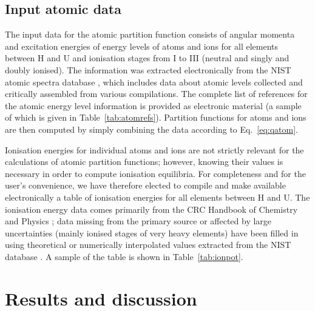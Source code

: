 \documentclass[traditabstract]{aa} %
\begin{document}
\subsection{Input atomic data}
The input data for the atomic partition function consists of angular momenta and excitation energies of energy levels of atoms and ions for all elements between H and U and ionisation stages from I to III (neutral and singly and doubly ionised). The information was extracted electronically from the NIST atomic spectra database \citep{Kramida:2014}, which includes data about atomic levels collected and critically assembled from various compilations. The complete list of references for the atomic energy level information is provided as electronic material (a sample of which is given in Table~\ref{tab:atomrefs}). Partition functions for atoms and ions are then computed by simply combining the data according to Eq.~\ref{eq:qatom}. 

Ionisation energies for individual atoms and ions are not strictly relevant for the calculations of atomic partition functions; however, knowing their values is necessary in order to compute ionisation equilibria. For completeness and for the user's convenience, we have therefore elected to compile and make available electronically a table of ionisation energies for all elements between H and U. The ionisation energy data comes primarily from the CRC Handbook of Chemistry and Physics \citep{CRC:2010}; data missing from the primary source or affected by large uncertainties (mainly ionised stages of very heavy elements) have been filled in using theoretical  or numerically interpolated values extracted from the NIST database \citep{Kramida:2014}. A sample of the table is shown in Table~\ref{tab:ionpot}.

\section{Results and discussion}
\label{sect:results}
\end{document}
